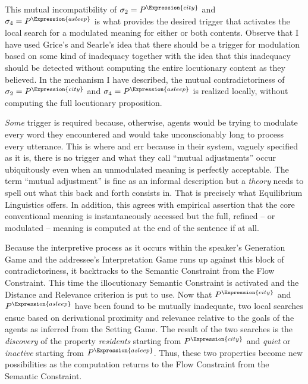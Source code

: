 This mutual incompatibility of $\sigma_2 = P^\Expression{city}$ and $\sigma_4 = P^\Expression{asleep}$ is what provides the desired trigger that activates the local search for a modulated meaning for either or both contents. Observe that I have used Grice's and Searle's idea that there should be a trigger for modulation based on some kind of inadequacy together with the idea that this inadequacy should be detected without computing the entire locutionary content as they believed. In the mechanism I have described, the mutual contradictoriness of $\sigma_2 = P^\Expression{city}$ and $\sigma_4 = P^\Expression{asleep}$ is realized locally, without computing the full locutionary proposition.

\emph{Some} trigger is required because, otherwise, agents would be trying to modulate every word they encountered and would take unconscionably long to process every utterance. This is where \citet{sw:dam} and \citet{wilson:pd} err because in their system, vaguely specified as it is, there is no trigger and what they call ``mutual adjustments'' occur ubiquitously even when an unmodulated meaning is perfectly acceptable. The term ``mutual adjustment'' is fine as an informal description but a \emph{theory} needs to spell out what this back and forth consists in. That is precisely what Equilibrium Linguistics offers. In addition, this agrees with  empirical assertion that the core conventional meaning is instantaneously accessed but the full, refined -- or modulated -- meaning is computed at the end of the sentence if at all.

Because the interpretive process as it occurs within the speaker's Generation Game and the addressee's Interpretation Game runs up against this block of contradictoriness, it backtracks to the Semantic Constraint from the Flow Constraint. This time the illocutionary Semantic Constraint is activated and the Distance and Relevance criterion is put to use. Now that $P^\Expression{city}$ and $P^\Expression{asleep}$ have been found to be mutually inadequate, two local searches ensue based on derivational proximity and relevance relative to the goals of the agents as inferred from the Setting Game. The result of the two searches is the \emph{discovery} of the property \emph{residents} starting from $P^\Expression{city}$ and \emph{quiet} or \emph{inactive} starting from $P^\Expression{asleep}$. Thus, these two properties become new possibilities as the computation returns to the Flow Constraint from the Semantic Constraint.

